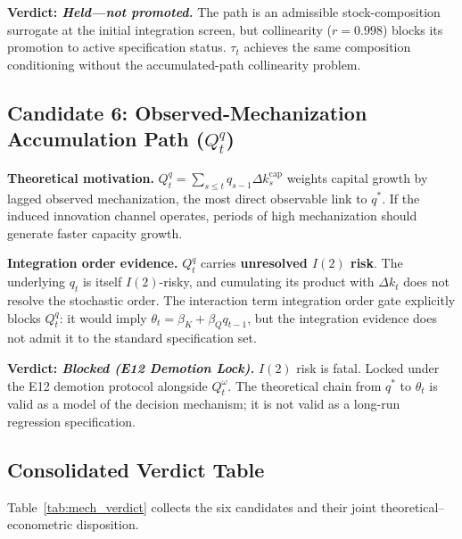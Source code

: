\documentclass[11pt,a4paper]{article}
\begin{document}
\textbf{Verdict: \textit{Held---not promoted.}} The path is an admissible stock-composition surrogate at the initial integration screen, but collinearity ($r = 0.998$) blocks its promotion to active specification status. $\tau_t$ achieves the same composition conditioning without the accumulated-path collinearity problem.

\subsection{Candidate 6: Observed-Mechanization Accumulation Path ($Q_t^q$)}

\textbf{Theoretical motivation.} $Q_t^q = \sum_{s \le t} q_{s-1} \Delta k_s^{\text{cap}}$ weights capital growth by lagged observed mechanization, the most direct observable link to $q^*$. If the induced innovation channel operates, periods of high mechanization should generate faster capacity growth.

\textbf{Integration order evidence.} $Q_t^q$ carries \textbf{unresolved $I(2)$ risk}. The underlying $q_t$ is itself $I(2)$-risky, and cumulating its product with $\Delta k_t$ does not resolve the stochastic order. The interaction term integration order gate explicitly blocks $Q_t^q$: it would imply $\theta_t = \beta_K + \beta_Q q_{t-1}$, but the integration evidence does not admit it to the standard specification set.

\textbf{Verdict: \textit{Blocked (E12 Demotion Lock).}} $I(2)$ risk is fatal. Locked under the E12 demotion protocol alongside $Q_t^\omega$. The theoretical chain from $q^*$ to $\theta_t$ is valid as a model of the decision mechanism; it is not valid as a long-run regression specification.

\FloatBarrier
\subsection{Consolidated Verdict Table}

Table~\ref{tab:mech_verdict} collects the six candidates and their joint theoretical--econometric disposition.
\end{document}
